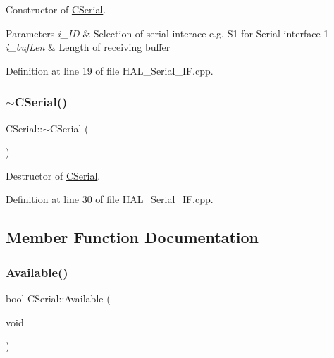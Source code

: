 Constructor of \mbox{\hyperlink{class_c_serial}{C\+Serial}}. 


\begin{DoxyParams}{Parameters}
{\em i\+\_\+\+ID} & Selection of serial interace e.\+g. S1 for Serial interface 1 \\
\hline
{\em i\+\_\+buf\+Len} & Length of receiving buffer \\
\hline
\end{DoxyParams}


Definition at line 19 of file H\+A\+L\+\_\+\+Serial\+\_\+\+I\+F.\+cpp.

\mbox{\label{class_c_serial_aff5444dd7e6a9ddc43cbce0e959edf7a}} 
\subsubsection{\texorpdfstring{$\sim$\+C\+Serial()}{~CSerial()}}
{\footnotesize\ttfamily C\+Serial\+::$\sim$\+C\+Serial (\begin{DoxyParamCaption}{ }\end{DoxyParamCaption})}



Destructor of \mbox{\hyperlink{class_c_serial}{C\+Serial}}. 



Definition at line 30 of file H\+A\+L\+\_\+\+Serial\+\_\+\+I\+F.\+cpp.



\subsection{Member Function Documentation}
\mbox{\label{class_c_serial_abb43734223d937a86e7616636ea16024}} 
\subsubsection{\texorpdfstring{Available()}{Available()}}
{\footnotesize\ttfamily bool C\+Serial\+::\+Available (\begin{DoxyParamCaption}\item[{void}]{ }\end{DoxyParamCaption})}



